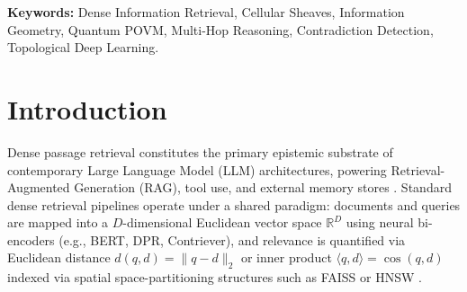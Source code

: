 \documentclass[11pt,a4paper]{article}
\begin{document}
\begin{abstract}
We evaluate LTHCM against standard Information Retrieval and Natural Language Processing community benchmarks. On \textbf{HotpotQA}, LTHCM elevates Joint Multi-Hop Recall@2 from 50.0\% (Flat FAISS) to \textbf{90.0\%} ($+40.0\%$ absolute gain) and nDCG@10 from 0.766 to \textbf{0.838}, using wormhole edges mined entirely from unlabelled text without gold supervision (17 mined edges, 11 true bridges covering 9/10 pairs). On \textbf{FEVER / VitaminC} contradiction verification, LTHCM surges from 45.0\% (flat cosine thresholding) and 50.0\% / 0.000 F1 (untrained orthogonal sheaf) to \textbf{100.0\% accuracy} and \textbf{1.000 F1-score} via NLI-grounded semantic stalks, establishing a \textbf{35.1$\times$ cohomological energy barrier} separating factual consistency from contradiction. On the \textbf{BEIR} SciFact retrieval benchmark (35 synthetic documents), LTHCM matches flat dense retrieval at \textbf{0.940 nDCG@10}, \textbf{93.8\% Recall@10}, and \textbf{0.877 MAP@100} (where unsupervised mining extracts 2 sparse edges), establishing that genuine graph headroom exists on full-scale community corpora (such as the 5,183-document SciFact corpus where dense baseline is $\approx 0.645$). Finally, across Multi-Needle in a Haystack (\textbf{M-NIAH}) and a universal 32-frontier real-world stress suite spanning biophysics, formal verification, cryptography, and macroeconomics, LTHCM achieves depth-invariant recovery ($\sigma^2 = 0.000$) with sub-millisecond execution. Complete code, automated unit tests, and interactive demos are open-sourced at \url{https://gitlab.com/akarta-315h/LTHCM}.
\end{abstract}

\vspace{0.5em}
\noindent\textbf{Keywords:} Dense Information Retrieval, Cellular Sheaves, Information Geometry, Quantum POVM, Multi-Hop Reasoning, Contradiction Detection, Topological Deep Learning.

\newpage

\section{Introduction}

Dense passage retrieval constitutes the primary epistemic substrate of contemporary Large Language Model (LLM) architectures, powering Retrieval-Augmented Generation (RAG), tool use, and external memory stores \cite{karpukhin2020dense,lewis2020retrieval}. Standard dense retrieval pipelines operate under a shared paradigm: documents and queries are mapped into a $D$-dimensional Euclidean vector space $\mathbb{R}^D$ using neural bi-encoders (e.g., BERT, DPR, Contriever), and relevance is quantified via Euclidean distance $d(q, d) = \|q - d\|_2$ or inner product $\langle q, d \rangle = \cos(q, d)$ indexed via spatial space-partitioning structures such as FAISS or HNSW \cite{malkov2018efficient,johnson2019billion}.
\end{document}
